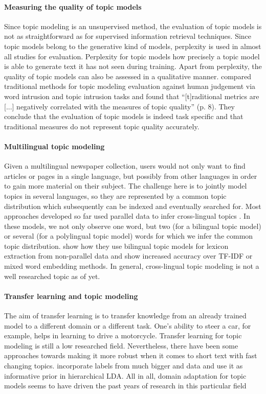\paragraph{Measuring the quality of topic models}
Since topic modeling is an unsupervised method, the evaluation of topic models is not as straightforward as for supervised information retrieval techniques. Since topic models belong to the generative kind of models, perplexity is used in almost all studies for evaluation. Perplexity for topic models how precisely a topic model is able to generate text it has not seen during training. Apart from perplexity, the quality of topic models can also be assessed in a qualitative manner. \citet{NIPS2009_3700} compared traditional methods for topic modeling evaluation against human judgement via word intrusion and topic intrusion tasks and found that ``[t]raditional metrics are [...] negatively correlated with the measures of topic quality'' (p. 8). They conclude that the evaluation of topic models is indeed task specific and that traditional measures do not represent topic quality accurately.

\paragraph{Multilingual topic modeling}
Given a multilingual newspaper collection, users would not only want to find articles or pages in a single language, but possibly from other languages in order to gain more material on their subject. The challenge here is to jointly model topics in several languages, so they are represented by a common topic distribution which subsequently can be indexed and eventually searched for. Most approaches developed so far used parallel data to infer cross-lingual topics \citep{dumaisautomatic1997,mimnopolylingual2009,zhangcrosslingual2010,nicross2011,vulicprobabilistic2015}. In these models,  we not only observe one word, but two (for a bilingual topic model) or several (for a polylingual topic model) words for which we infer the common topic distribution. \citet{Ma16b} show how they use bilingual topic models for lexicon extraction from non-parallel data and show increased accuracy over TF-IDF or mixed word embedding methods. In general, cross-lingual topic modeling is not a well researched topic as of yet.

\paragraph{Transfer learning and topic modeling}
The aim of transfer learning is to transfer knowledge from an already trained model to a different domain or a different task. One's ability to steer a car, for example, helps in learning to drive a motorcycle. Transfer learning for topic modeling is still a low researched field. Nevertheless, there have been some approaches towards making it more robust when it comes to short text with fast changing topics. \citet{kang2013} incorporate labels from much bigger and data and use it as informative prior in hierarchical LDA.  All in all, domain adaptation for topic models seems to have driven the past years of research in this particular field \citep{pmlr-v32-chenf14,Faisal:2013:TLU:2483325.2483473}

